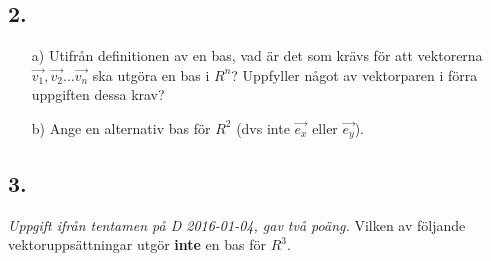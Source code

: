 \documentclass{article}
\begin{document}
\subsection*{2.}
\begin{itemize}
	\item[a) ] Utifrån definitionen av en bas, vad är det som krävs för att vektorerna $\vec{v_1}, \vec{v_2} ... \vec{v_n}$ ska utgöra en bas i $R^n$? Uppfyller något av vektorparen i förra uppgiften dessa krav?
	\item[b) ] Ange en alternativ bas för $R^2$ (dvs inte $\vec{e_x}$ eller $\vec{e_y}$).
\end{itemize}

\subsection*{3.}
\textit{Uppgift ifrån tentamen på D 2016-01-04, gav två poäng.}
Vilken av följande vektoruppsättningar utgör \textbf{inte} en bas för $R^3$.
\end{document}
